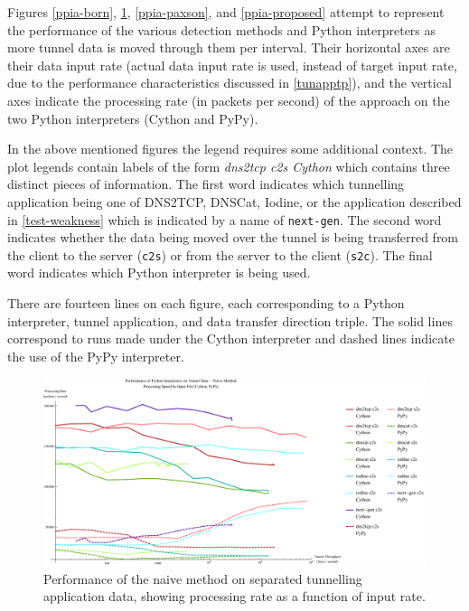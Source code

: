 \documentclass[12pt]{report}
\theoremstyle{remark}
\theoremstyle{definition}
\theoremstyle{definition}
\theoremstyle{definition}
\begin{document}
Figures \ref{ppia-born}, \ref{ppia-naive}, \ref{ppia-paxson}, and
\ref{ppia-proposed} attempt to represent the performance of the various
detection methods and Python interpreters as more tunnel data is moved through
them per interval. Their horizontal axes are their data input rate (actual data
input rate is used, instead of target input rate, due to the performance
characteristics discussed in \ref{tunapptp}), and the vertical axes indicate the
processing rate (in packets per second) of the approach on the two Python
interpreters (Cython and PyPy).

In the above mentioned figures the legend requires some additional context. The
plot legends contain labels of the form \emph{dns2tcp c2s Cython} which contains
three distinct pieces of information. The first word indicates which tunnelling
application being one of DNS2TCP, DNSCat, Iodine, or the application described
in \ref{test-weakness} which is indicated by a name of \texttt{next-gen}. The
second word indicates whether the data being moved over the tunnel is being
transferred from the client to the server (\texttt{c2s}) or from the server to
the client (\texttt{s2c}). The final word indicates which Python interpreter is
being used.

There are fourteen lines on each figure, each corresponding to a Python
interpreter, tunnel application, and data transfer direction triple. The solid
lines correspond to runs made under the Cython interpreter and dashed lines
indicate the use of the PyPy interpreter.

\begin{figure}
\centering
\includegraphics[width=\textwidth]{figures/ppia-naive.pdf}
\caption[Performance of Naive Method on Tunnel Data by Python
Interpreter]{Performance of the naive method on separated tunnelling application
data, showing processing rate as a function of input rate.}
\label{ppia-naive}
\end{figure}
\end{document}
